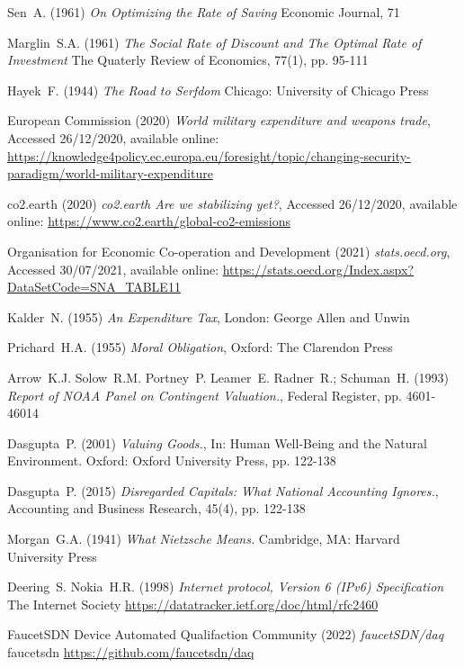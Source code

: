 \documentclass[11pt, oneside]{article}   	%
\begin{document}
\begin{thebibliography}{99}
 Sen~A. (1961)
\emph{On Optimizing the Rate of Saving}
Economic Journal, 71
	
 Marglin~S.A. (1961)
\emph{The Social Rate of Discount and The Optimal Rate of Investment}
The Quaterly Review of Economics, 77(1), pp. 95-111
	
 Hayek~F. (1944)
\emph{The Road to Serfdom}
Chicago: University of Chicago Press
	
 European Commission (2020)
\emph{World military expenditure and weapons trade},
Accessed 26/12/2020, available online: 
\url{https://knowledge4policy.ec.europa.eu/foresight/topic/changing-security-paradigm/world-military-expenditure}
	
 co2.earth (2020)
\emph{co2.earth Are we stabilizing yet?},
Accessed 26/12/2020, available online: 
\url{https://www.co2.earth/global-co2-emissions}
	
 Organisation for Economic Co-operation and Development (2021)
\emph{stats.oecd.org},
Accessed 30/07/2021, available online: 
\url{https://stats.oecd.org/Index.aspx?DataSetCode=SNA_TABLE11}
	
 Kalder~N. (1955)
\emph{An Expenditure Tax},
London: George Allen and Unwin
	
 Prichard~H.A. (1955)
\emph{Moral Obligation},
Oxford: The Clarendon Press

 Arrow~K.J. Solow~R.M. Portney~P. Leamer~E. Radner~R.; Schuman~H. (1993)
\emph{Report of NOAA Panel on Contingent Valuation.},
Federal Register, pp. 4601-46014
	
 Dasgupta~P. (2001)
\emph{Valuing Goods.},
In: Human Well-Being and the Natural Environment. Oxford: Oxford University Press, pp. 122-138
	
 Dasgupta~P. (2015)
\emph{Disregarded Capitals: What National Accounting Ignores.},
Accounting and Business Research, 45(4), pp. 122-138
	
 Morgan~G.A. (1941)
\emph{What Nietzsche Means.}
Cambridge, MA: Harvard University Press

 Deering~S. Nokia~H.R. (1998)
\emph{Internet protocol, Version 6 (IPv6) Specification}
The Internet Society
\url{https://datatracker.ietf.org/doc/html/rfc2460}

 FaucetSDN Device Automated Qualifaction Community (2022)
\emph{faucetSDN/daq}
faucetsdn
\url{https://github.com/faucetsdn/daq}


\end{thebibliography}
\end{document}
